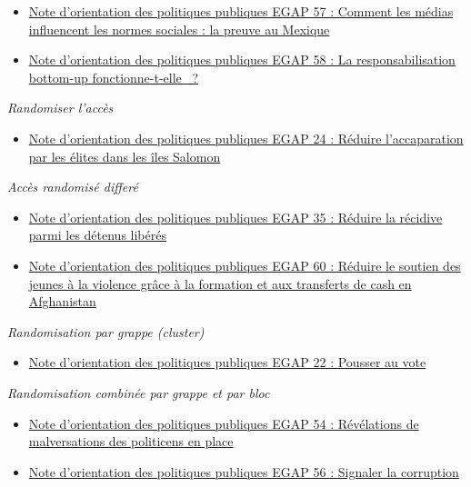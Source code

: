 \documentclass[
  12pt,
]{book}
\providecommand{\tightlist}{%
  \setlength{\itemsep}{0pt}\setlength{\parskip}{0pt}}
\begin{document}
\begin{itemize}
\item
  \href{https://egap.org/resource/how-media-influence-social-norms-evidence-from-mexico/}{Note d'orientation des politiques publiques EGAP 57 : Comment les médias influencent les normes sociales : la preuve au Mexique}
\item
  \href{https://egap.org/resource/does-bottom-up-accountability-work-evidence-from-uganda/}{Note d'orientation des politiques publiques EGAP 58 : La responsabilisation bottom-up fonctionne-t-elle~ ?}
\end{itemize}

\emph{Randomiser l'accès}

\begin{itemize}
\tightlist
\item
  \href{https://egap.org/resource/brief-24-reducing-elite-capture-in-the-solomon-islands/}{Note d'orientation des politiques publiques EGAP 24 : Réduire l'accaparation par les élites dans les îles Salomon}
\end{itemize}

\emph{Accès randomisé differé}

\begin{itemize}
\item
  \href{https://egap.org/resource/brief-35-reducing-reconvictions-among-released-prisoners/}{Note d'orientation des politiques publiques EGAP 35 : Réduire la récidive parmi les détenus libérés}
\item
  \href{https://egap.org/resource/reducing-youth-support-for-violence-through-training-and-cash-transfers-in-afghanistan/}{Note d'orientation des politiques publiques EGAP 60 : Réduire le soutien des jeunes à la violence grâce à la formation et aux transferts de cash en Afghanistan}
\end{itemize}

\emph{Randomisation par grappe (cluster)}

\begin{itemize}
\tightlist
\item
  \href{https://egap.org/resource/brief-22-getting-out-the-vote/}{Note d'orientation des politiques publiques EGAP 22 : Pousser au vote}
\end{itemize}

\emph{Randomisation combinée par grappe et par bloc}

\begin{itemize}
\item
  \href{https://egap.org/resource/evidence-from-mexico-the-effect-of-incumbent-malfeasance-revelations/}{Note d'orientation des politiques publiques EGAP 54 : Révélations de malversations des politicens en place}
\item
  \href{https://egap.org/resource/reporting-corruption-in-nigeria-testing-the-effects-of-norms-nudges/}{Note d'orientation des politiques publiques EGAP 56 : Signaler la corruption}
\end{itemize}
\end{document}
